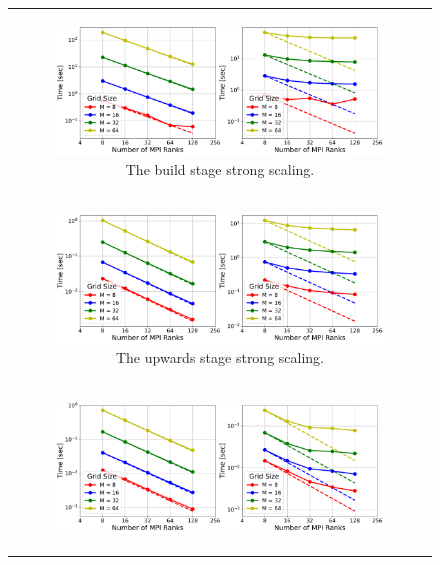 \begin{figure}
    \centering
    \begin{tabular}{c}
        \begin{subfigure}[t]{0.95\textwidth}
            \centering
            \includegraphics[width=\textwidth]{figures/build-strong-scaling-timing-no-title.pdf}
            \caption{The build stage strong scaling.}
            \label{subfig:strong_build}
        \end{subfigure}
        \\
        \begin{subfigure}[t]{0.95\textwidth}
            \centering
            \includegraphics[width=\textwidth]{figures/upwards-strong-scaling-timing-no-title.pdf}
            \caption{The upwards stage strong scaling.}
            \label{subfig:strong_upwards}    
        \end{subfigure}
        \\
        \begin{subfigure}[t]{0.95\textwidth}
            \centering
            \includegraphics[width=\textwidth]{figures/solve-strong-scaling-timing-no-title.pdf}

\end{subfigure}
\end{tabular}
\end{figure}
